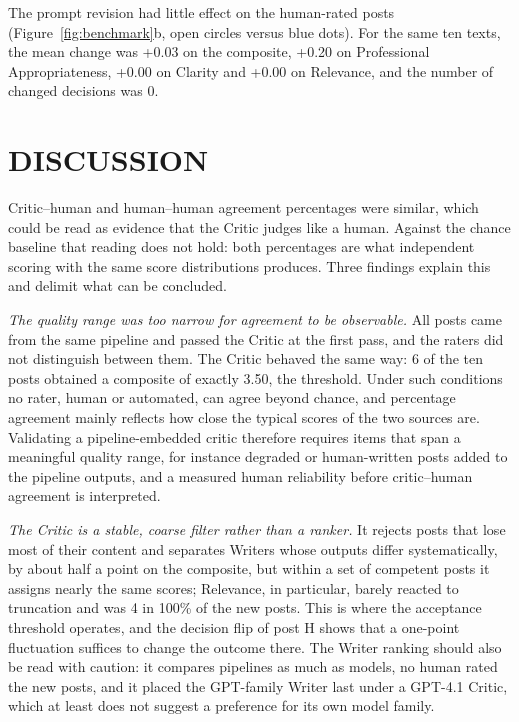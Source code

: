 \documentclass[a4paper,twoside]{article}
\newcommand{\CompAtThreshold}{6}
\newcommand{\BmShiftClar}{+0.00}
\newcommand{\BmShiftRel}{+0.00}
\newcommand{\BmShiftPro}{+0.20}
\newcommand{\BmShiftComp}{+0.03}
\newcommand{\BmShiftDecisions}{0}
\newcommand{\BmRelModeShare}{100\%}
\begin{document}
The prompt revision had little effect on the human-rated posts (Figure~\ref{fig:benchmark}b, open circles versus blue dots). For the same ten texts, the mean change was \BmShiftComp{} on the composite, \BmShiftPro{} on Professional Appropriateness, \BmShiftClar{} on Clarity and \BmShiftRel{} on Relevance, and the number of changed decisions was \BmShiftDecisions{}.

\section{\uppercase{Discussion}}
\label{sec:discussion}

Critic--human and human--human agreement percentages were similar, which could be read as evidence that the Critic judges like a human. Against the chance baseline that reading does not hold: both percentages are what independent scoring with the same score distributions produces. Three findings explain this and delimit what can be concluded.

\emph{The quality range was too narrow for agreement to be observable.} All posts came from the same pipeline and passed the Critic at the first pass, and the raters did not distinguish between them. The Critic behaved the same way: \CompAtThreshold{} of the ten posts obtained a composite of exactly 3.50, the threshold. Under such conditions no rater, human or automated, can agree beyond chance, and percentage agreement mainly reflects how close the typical scores of the two sources are. Validating a pipeline-embedded critic therefore requires items that span a meaningful quality range, for instance degraded or human-written posts added to the pipeline outputs, and a measured human reliability before critic--human agreement is interpreted.

\emph{The Critic is a stable, coarse filter rather than a ranker.} It rejects posts that lose most of their content and separates Writers whose outputs differ systematically, by about half a point on the composite, but within a set of competent posts it assigns nearly the same scores; Relevance, in particular, barely reacted to truncation and was 4 in \BmRelModeShare{} of the new posts. This is where the acceptance threshold operates, and the decision flip of post H shows that a one-point fluctuation suffices to change the outcome there. The Writer ranking should also be read with caution: it compares pipelines as much as models, no human rated the new posts, and it placed the GPT-family Writer last under a GPT-4.1 Critic, which at least does not suggest a preference for its own model family.
\end{document}
